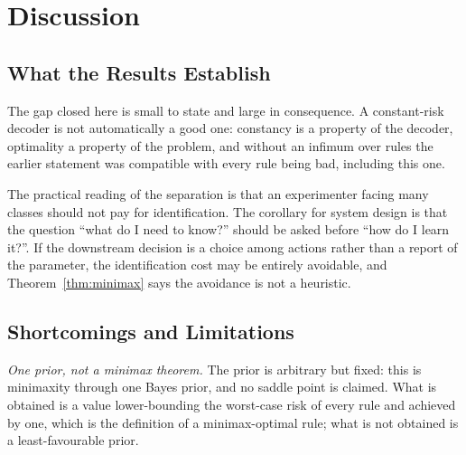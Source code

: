 \section{Discussion}
\label{sec:discussion}

\subsection{What the Results Establish}

The gap closed here is small to state and large in consequence. A constant-risk decoder is not
automatically a good one: constancy is a property of the decoder, optimality a property of the
problem, and without an infimum over rules the earlier statement was compatible with every
rule being bad, including this one.

The practical reading of the separation is that an experimenter facing many classes should not
pay for identification. The corollary for system design is that the question ``what do I need
to know?'' should be asked before ``how do I learn it?''. If the downstream decision is a
choice among actions rather than a report of the parameter, the identification cost may be
entirely avoidable, and Theorem~\ref{thm:minimax} says the avoidance is not a heuristic.

\subsection{Shortcomings and Limitations}

\emph{One prior, not a minimax theorem.} The prior is arbitrary but fixed: this is minimaxity
through one Bayes prior, and no saddle point is claimed. What is obtained is a value
lower-bounding the worst-case risk of every rule and achieved by one, which is the definition
of a minimax-optimal rule; what is not obtained is a least-favourable prior.

